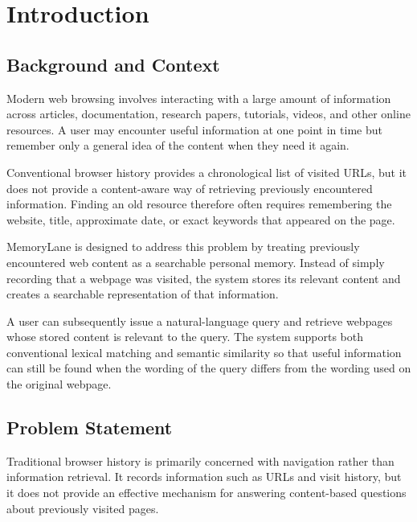\documentclass{tietreport}
\author{%
  \texttt{1024030716} Rabeeh Ahmad \\
  \texttt{1024030719} Ishan Singhania%
}
\begin{document}
\maketitle

\tableofcontents


\chapter{Introduction}

\section{Background and Context}

Modern web browsing involves interacting with a large amount
of information across articles, documentation, research
papers, tutorials, videos, and other online resources. A user
may encounter useful information at one point in time but
remember only a general idea of the content when they need it
again.

Conventional browser history provides a chronological list of
visited URLs, but it does not provide a content-aware way of
retrieving previously encountered information. Finding an old
resource therefore often requires remembering the website,
title, approximate date, or exact keywords that appeared on
the page.

MemoryLane is designed to address this problem by treating
previously encountered web content as a searchable personal
memory. Instead of simply recording that a webpage was visited,
the system stores its relevant content and creates a searchable
representation of that information.

A user can subsequently issue a natural-language query and
retrieve webpages whose stored content is relevant to the
query. The system supports both conventional lexical matching
and semantic similarity so that useful information can still be
found when the wording of the query differs from the wording
used on the original webpage.

\section{Problem Statement}

Traditional browser history is primarily concerned with
navigation rather than information retrieval. It records
information such as URLs and visit history, but it does not
provide an effective mechanism for answering content-based
questions about previously visited pages.
\end{document}
